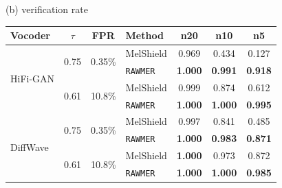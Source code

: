 \begin{table}[t]
\begin{minipage}[t]{0.495\linewidth}
\centering
{\footnotesize (b) verification rate\par}\vspace{2pt}
\setlength{\tabcolsep}{4pt}
\begin{tabular}{@{}l c c l c c c@{}}
\toprule
Vocoder & $\tau$ & FPR & Method & n20 & n10 & n5 \\
\midrule
\multirow{4}{*}{HiFi-GAN}
 & \multirow{2}{*}{0.75} & \multirow{2}{*}{0.35\%} & MelShield & 0.969 & 0.434 & 0.127 \\
 & & & \texttt{RAWMER} & \textbf{1.000} & \textbf{0.991} & \textbf{0.918} \\
\cmidrule(lr){2-7}
 & \multirow{2}{*}{0.61} & \multirow{2}{*}{10.8\%} & MelShield & 0.999 & 0.874 & 0.612 \\
 & & & \texttt{RAWMER} & \textbf{1.000} & \textbf{1.000} & \textbf{0.995} \\
\midrule
\multirow{4}{*}{DiffWave}
 & \multirow{2}{*}{0.75} & \multirow{2}{*}{0.35\%} & MelShield & 0.997 & 0.841 & 0.485 \\
 & & & \texttt{RAWMER} & \textbf{1.000} & \textbf{0.983} & \textbf{0.871} \\
\cmidrule(lr){2-7}
 & \multirow{2}{*}{0.61} & \multirow{2}{*}{10.8\%} & MelShield & \textbf{1.000} & 0.973 & 0.872 \\
 & & & \texttt{RAWMER} & \textbf{1.000} & \textbf{1.000} & \textbf{0.985} \\
\bottomrule
\end{tabular}
\end{minipage}
\end{table}
